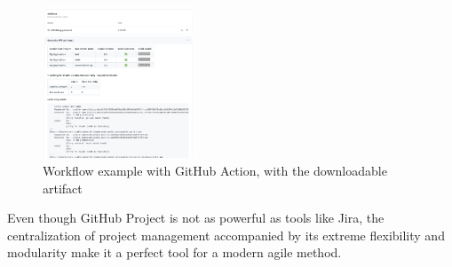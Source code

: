 \begin{figure}[h]
    \centering
    \includegraphics[width=0.4\textwidth]{img/GitHubAction}
    \caption{Workflow example with GitHub Action, with the downloadable artifact}
    \label{fig:GitHubAction}
\end{figure}


Even though GitHub Project is not as powerful as tools like Jira,
the centralization of project management accompanied by its extreme flexibility and modularity make it a perfect tool
for a modern agile method.
